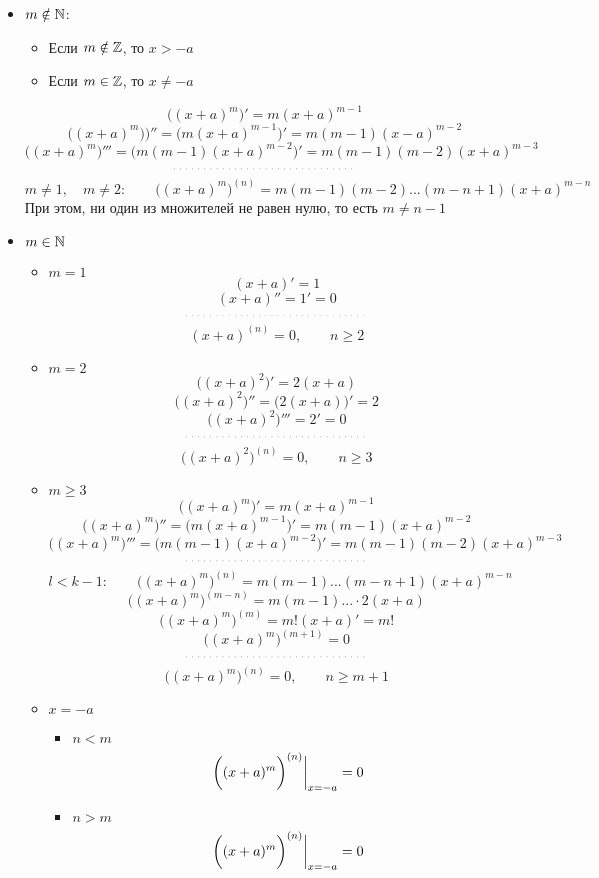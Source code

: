 \begin{itemize}
	\item $m \notin \mathbb{N}$:
	\begin{itemize}
		\item Если $m \notin \mathbb{Z}$, то $x > -a$
		\item Если $m \in \mathbb{Z}$, то $x \ne -a$
	\end{itemize}
	$$ \bigg( (x + a)^m \bigg)' = m(x + a)^{m - 1} $$
	$$ \bigg( (x + a)^m) \bigg)'' = \bigg( m(x + a)^{m - 1} \bigg)' = m(m - 1)(x - a)^{m - 2} $$
	$$ \bigg( (x + a)^m \bigg)''' = \bigg( m(m - 1)(x + a)^{m - 2} \bigg)' = m(m - 1)(m - 2)(x + a)^{m - 3} $$
	$$ \widedots $$
	$$ m \ne 1, \quad m \ne 2 : \qquad \bigg( (x + a)^m \bigg)^{(n)} = m(m - 1)(m - 2)...(m - n + 1)(x + a)^{m - n} $$
	При этом, ни один из множителей не равен нулю, то есть $m \ne n - 1$
	\item $m \in \mathbb{N}$
	\begin{itemize}
		\item $m = 1$
		$$ (x + a)' = 1 $$
		$$ (x + a)'' = 1' = 0 $$
		$$ \widedots $$
		$$ (x + a)^{(n)} = 0, \qquad n \ge 2 $$
		\item $m = 2$
		$$ \bigg( (x + a)^2 \bigg)' = 2(x + a) $$
		$$ \bigg( (x + a)^2 \bigg)'' = \bigg( 2(x + a) \bigg)' = 2 $$
		$$ \bigg( (x + a)^2 \bigg)''' = 2' = 0 $$
		$$ \widedots $$
		$$ \bigg( (x + a)^2 \bigg)^{(n)} = 0, \qquad n \ge 3 $$
		\item $m \ge 3$
		$$ \bigg( (x + a)^m \bigg)' = m(x + a)^{m - 1} $$
		$$ \bigg( (x + a)^m \bigg)'' = \bigg( m(x + a)^{m - 1} \bigg)' = m(m - 1)(x + a)^{m - 2} $$
		$$ \bigg( (x + a)^m \bigg)''' = \bigg( m(m - 1)(x + a)^{m - 2} \bigg)' = m(m - 1)(m - 2)(x + a)^{m - 3} $$
		$$ \widedots $$
		$$ l < k - 1 : \qquad \bigg( (x + a)^m \bigg)^{(n)} = m(m - 1)...(m - n + 1)(x + a)^{m - n} $$
		$$ \bigg( (x + a)^m \bigg)^{(m - n)} = m(m - 1)... \cdot 2(x + a) $$
		$$ \bigg( (x + a)^m \bigg)^{(m)} = m! (x + a)' = m! $$
		$$ \bigg( (x + a)^m \bigg)^{(m + 1)} = 0 $$
		$$ \widedots $$
		$$ \bigg( (x + a)^m \bigg)^{(n)} = 0, \qquad n \ge m + 1 $$
		\item $x = -a$
		\begin{itemize}
			\item $n < m$
			$$ \bigg( (x + a)^m \bigg)^{(n)} \bigg|_{x = -a}^{} = 0 $$
			\item $n > m$
			$$ \bigg( (x + a)^m \bigg)^{(n)} \bigg|_{x = -a}^{} = 0 $$
		\end{itemize}
	\end{itemize}
\end{itemize}


